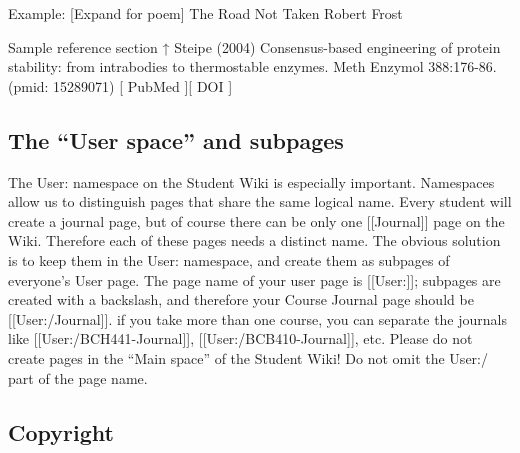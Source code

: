 \documentclass[]{book}
\begin{document}
Example: {[}Expand for poem{]} The Road Not Taken Robert Frost

Sample reference section ↑ Steipe (2004) Consensus-based engineering of
protein stability: from intrabodies to thermostable enzymes. Meth
Enzymol 388:176-86. (pmid: 15289071) {[} PubMed {]}{[} DOI {]}

\subsection{\texorpdfstring{The ``User space'' and
subpages}{The User space and subpages}}\label{the-user-space-and-subpages}

The User: namespace on the Student Wiki is especially important.
Namespaces allow us to distinguish pages that share the same logical
name. Every student will create a journal page, but of course there can
be only one {[}{[}Journal{]}{]} page on the Wiki. Therefore each of
these pages needs a distinct name. The obvious solution is to keep them
in the User: namespace, and create them as subpages of everyone's User
page. The page name of your user page is {[}{[}User:{]}{]}; subpages are
created with a backslash, and therefore your Course Journal page should
be {[}{[}User:/Journal{]}{]}. if you take more than one course, you can
separate the journals like {[}{[}User:/BCH441-Journal{]}{]},
{[}{[}User:/BCB410-Journal{]}{]}, etc. Please do not create pages in the
``Main space'' of the Student Wiki! Do not omit the User:/ part of the
page name.

\subsection{Copyright}\label{copyright}
\end{document}
